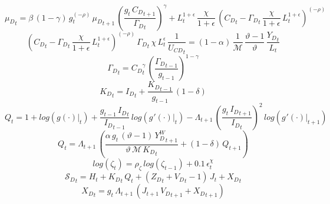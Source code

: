 \documentclass[10pt,a4paper]{article}
\begin{document}
\begin{dmath}
{{\mu}_{D}}_{t}=\beta\, \left(1-\gamma\right)\, {g}_{t}^{\left(-\rho\right)}\, {{\mu}_{D}}_{t+1}\, \left(\frac{{g}_{t}\, {C_D}_{t+1}}{{\Gamma_D}_{t}}\right)^{\gamma}+{L}_{t}^{1+\epsilon}\, \frac{\chi}{1+\epsilon}\, \left({C_D}_{t}-{\Gamma_D}_{t}\, \frac{\chi}{1+\epsilon}\, {L}_{t}^{1+\epsilon}\right)^{\left(-\rho\right)}
\end{dmath}
\begin{dmath}
\left({C_D}_{t}-{\Gamma_D}_{t}\, \frac{\chi}{1+\epsilon}\, {L}_{t}^{1+\epsilon}\right)^{\left(-\rho\right)}\, {\Gamma_D}_{t}\, \chi\, {L}_{t}^{\epsilon}\, \frac{1}{{U_{CD}}_{t}}=\left(1-\alpha\right)\, \frac{1}{\mathcal{M}}\, \frac{\vartheta-1}{\vartheta}\, \frac{{Y_D}_{t}}{{L}_{t}}
\end{dmath}
\begin{dmath}
{\Gamma_D}_{t}={C_D}_{t}^{\gamma}\, \left(\frac{{\Gamma_D}_{t-1}}{{g}_{t-1}}\right)^{1-\gamma}
\end{dmath}
\begin{dmath}
{K_D}_{t}={I_D}_{t}+\frac{{K_D}_{t-1}}{{g}_{t-1}}\, \left(1-\delta\right)
\end{dmath}
\begin{dmath}
{Q}_{t}=1+log\left({\left.       g\left( \cdot \right)            \right|}_{t}\right)+\frac{{g}_{t-1}\, {I_D}_{t}}{{I_D}_{t-1}}\, log\left({\left.       g^‎{\prime}\left( \cdot \right)   \right|}_{t}\right)-{\Lambda}_{t+1}\, \left(\frac{{g}_{t}\, {I_D}_{t+1}}{{I_D}_{t}}\right)^{2}\, log\left({\left.       g^‎{\prime}\left( \cdot \right)   \right|}_{t+1}\right)
\end{dmath}
\begin{dmath}
{Q}_{t}={\Lambda}_{t+1}\, \left(\frac{\alpha\, {g}_{t}\, \left(\vartheta-1\right)\, {Y^W_D}_{t+1}}{\vartheta\, \mathcal{M}\, {K_D}_{t}}+\left(1-\delta\right)\, {Q}_{t+1}\right)
\end{dmath}
\begin{dmath}
log\left({\zeta}_{t}\right)={\rho}_{\zeta}\, log\left({\zeta}_{t-1}\right)+0.1\, {\epsilon}^{\chi}_{t}
\end{dmath}
\begin{dmath}
{\mathcal{S}_{D}}_{t}={H}_{t}+{K_D}_{t}\, {Q}_{t}+\left({Z_D}_{t}+{V_D}_{t}-1\right)\, {J}_{t}+{X_D}_{t}
\end{dmath}
\begin{dmath}
{X_D}_{t}={g}_{t}\, {\Lambda}_{t+1}\, \left({J}_{t+1}\, {V_D}_{t+1}+{X_D}_{t+1}\right)
\end{dmath}
\end{document}
